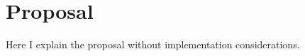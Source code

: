 \section{Proposal}\label{sec:proposal}

Here I explain the proposal without implementation considerations.
